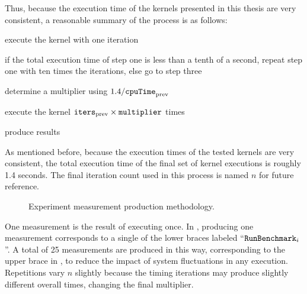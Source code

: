 \documentclass[\main/thesis.tex]{subfiles}
\begin{document}
Thus, because the execution time of the kernels presented in this thesis are very consistent, a reasonable summary of the process is as follows:
\begin{enumerate*}[itemjoin={{; }}, itemjoin*={{; }}, label=(\arabic*), after={.}]
  \item execute the kernel with one iteration
  \item if the total execution time of step one is less than a tenth of a second, repeat step one with ten times the iterations, else go to step three
  \item determine a multiplier using $1.4 / \textrm{\code{cpuTime}}_{\textrm{prev}}$
  \item execute the kernel $\textrm{\code{iters}}_{\textrm{prev}} \times \textrm{\code{multiplier}}$ times
  \item produce results
\end{enumerate*}
As mentioned before, because the execution times of the tested kernels are very consistent, the total execution time of the final set of kernel executions is roughly 1.4 seconds.
The final iteration count used in this process is named $n$ for future reference.

\begin{figure}[t]
  \centering
  \caption[Experiment Measurement Methodology]{Experiment measurement production methodology.}
  \label{fig:execution}
\end{figure}

One measurement is the result of executing  once.
In , producing one measurement corresponds to a single of the lower braces labeled ``$\textrm{\code{RunBenchmark}}_i$''.
A total of 25 measurements are produced in this way, corresponding to the upper brace in , to reduce the impact of system fluctuations in any execution.
Repetitions vary $n$ slightly because the timing iterations may produce slightly different overall times, changing the final multiplier.
\end{document}
